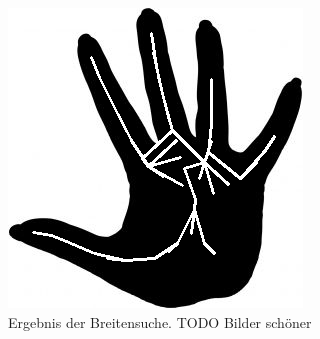 \begin{figure}[htbp]
\begin{minipage}{5cm}
		\includegraphics[width=1.0\linewidth]{./fig/hand-bfs}
	\end{minipage}
	\caption{Ergebnis der Breitensuche. TODO Bilder schöner}
	\label{fig:hand_BFS}
	\end{figure}
